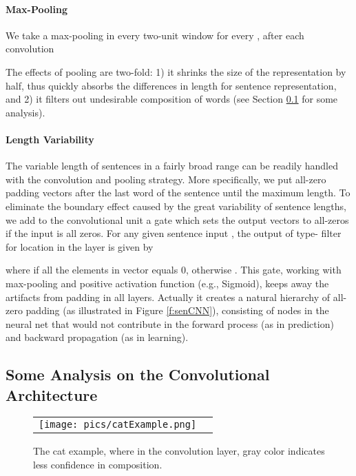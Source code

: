 \documentclass{article} \usepackage{nips14submit_e,times}
\newcommand{\0}{\ensuremath{\mathbf{0}}}
\newcommand{\1}{\ensuremath{\mathbf{1}}}
\begin{document}
\paragraph{Max-Pooling}\vspace{-10pt}
We take a max-pooling in every two-unit window for every , after each convolution

The effects of pooling are two-fold: 1) it shrinks the size of the representation by half, thus quickly absorbs the differences in length for sentence representation, and 2) it filters out undesirable composition of words (see Section \ref{s:someAnalysis} for some analysis).

\paragraph{Length Variability} The variable length of sentences in a fairly broad range can be readily handled with the convolution and pooling strategy. More specifically, we put all-zero padding vectors after the last word of the sentence until the maximum length. To eliminate the boundary effect caused by the great variability of sentence lengths, we add to the convolutional unit a gate which sets the output vectors to all-zeros if the input is all zeros. For any given sentence input , the output of type- filter for location  in the   layer is given by

where  if all the elements in vector  equals 0, otherwise . This gate, working with max-pooling and positive activation function (e.g., Sigmoid), keeps away the artifacts from padding in all layers. Actually it creates a natural hierarchy of all-zero padding (as illustrated in Figure \ref{f:senCNN}), consisting of nodes in the neural net that would not contribute in the forward process (as in prediction) and backward propagation (as in learning).


\subsection{Some Analysis on the Convolutional Architecture} \label{s:someAnalysis} \vspace{-10pt}
\begin{wrapfigure}{r}{0.6\textwidth}
\begin{center}
\vspace{-5pt}
    \begin{tabular}[c]{cc}
     \texttt{[image: pics/catExample.png]}
     \end{tabular}
\vspace{-10pt}
    \caption{The cat example, where in the convolution layer, gray color indicates less confidence in composition.} \vspace{-5pt}
    \label{f:cat}
  \end{center}
\end{wrapfigure}
\end{document}
